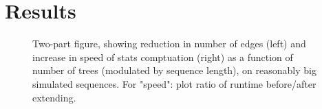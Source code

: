 \documentclass[10pt,twoside,lineno]{gsajnl}
\begin{document}
% 
% 
% 
% 
% 
% 


\section{Results}


\begin{figure}
    \caption{
        Two-part figure, showing reduction in number of edges (left) and increase in speed of stats comptuation (right)
        as a function of number of trees (modulated by sequence length),
        on reasonably big simulated sequences.
        For "speed": plot ratio of runtime before/after extending.
        \label{fig:speed_and_edges}
    }
\end{figure}
\end{document}
